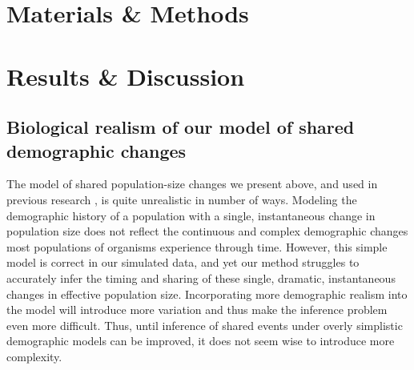 

\section{Materials \& Methods}




\section{Results \& Discussion}



\subsection{Biological realism of our model of shared demographic changes}
The model of shared population-size changes we present above, and used in
previous research \citep{Chan2014,Xue2015,Gehara2017,Xue2015}, is quite
unrealistic in number of ways.
Modeling the demographic history of a population with a single,
instantaneous change in population size does not reflect the continuous and
complex demographic changes most populations of organisms experience through
time.
However, this simple model is correct in our simulated data, and yet our method
struggles to accurately infer the timing and sharing of these single, dramatic,
instantaneous changes in effective population size.
Incorporating more demographic realism into the model will introduce more
variation and thus make the inference problem even more difficult.
Thus, until inference of shared events under overly simplistic demographic
models can be improved, it does not seem wise to introduce more complexity.

